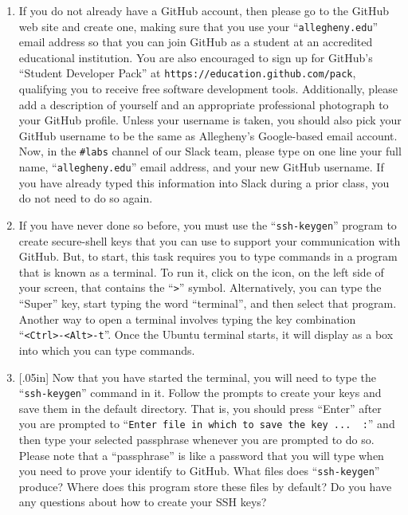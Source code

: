 \documentclass[11pt]{article}
\newcommand{\command}[1]{``\lstinline{#1}''}
\newcommand{\url}[1]{\lstinline{#1}}
\newcommand{\channel}[1]{\lstinline{#1}}
\newcommand{\think}[1]{\null\hfill\LARGE{\faCogs{}}\newline\scriptsize{\em{#1}}}
\begin{document}
\begin{enumerate}

  \item If you do not already have a GitHub account, then please go to the
    GitHub web site and create one, making sure that you use your
    \command{allegheny.edu} email address so that you can join GitHub as a
    student at an accredited educational institution. You are also encouraged
    to sign up for GitHub's ``Student Developer Pack'' at
    \url{https://education.github.com/pack}, qualifying you to receive free
    software development tools. Additionally, please add a description of
    yourself and an appropriate professional photograph to your GitHub profile.
    Unless your username is taken, you should also pick your GitHub username to
    be the same as Allegheny's Google-based email account. Now, in the
    \channel{#labs} channel of our Slack team, please type on one line your
    full name, \command{allegheny.edu} email address, and your new GitHub
    username. If you have already typed this information into Slack during a
    prior class, you do not need to do so again.

  \item If you have never done so before, you must use the \command{ssh-keygen}
    program to create secure-shell keys that you can use to support your
    communication with GitHub. But, to start, this task requires you to type
    commands in a program that is known as a terminal. To run it, click on the
    icon, on the left side of your screen, that contains the \command{>}
    symbol. Alternatively, you can type the ``Super'' key, start typing the
    word ``terminal'', and then select that program. Another way to open a
    terminal involves typing the key combination \command{<Ctrl>-<Alt>-t}. Once
    the Ubuntu terminal starts, it will display as a box into which you can
    type commands.

  \item \marginnote{\think{Understand SSH keys}}[.05in] Now that you have
    started the terminal, you will need to type the \command{ssh-keygen} command
    in it. Follow the prompts to create your keys and save them in the default
    directory. That is, you should press ``Enter'' after you are prompted to
    \command{Enter file in which to save the key ...  :} and then type your
    selected passphrase whenever you are prompted to do so. Please note that a
    ``passphrase'' is like a password that you will type when you need to prove
    your identify to GitHub. What files does \command{ssh-keygen} produce? Where
    does this program store these files by default? Do you have any questions
    about how to create your SSH keys?


\end{enumerate}
\end{document}
